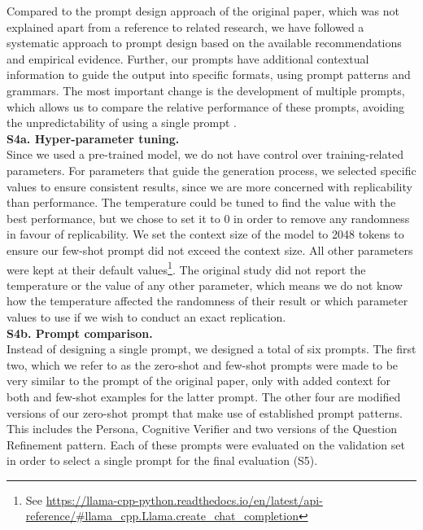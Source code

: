 \documentclass[a4paper]{article}
\begin{document}
Compared to the prompt design approach of the original paper, which was not explained apart from a reference to related research, we have followed a systematic approach to prompt design based on the available recommendations and empirical evidence. Further, our prompts have additional contextual information to guide the output into specific formats, using prompt patterns and grammars. The most important change is the development of multiple prompts, which allows us to compare the relative performance of these prompts, avoiding the unpredictability of using a single prompt \cite{mizrahi2024stateartmultipromptllm}.\\

\textbf{S4a. Hyper-parameter tuning.}\\
Since we used a pre-trained model, we do not have control over training-related parameters. For parameters that guide the generation process, we selected specific values to ensure consistent results, since we are more concerned with replicability than performance. The temperature could be tuned to find the value with the best performance, but we chose to set it to 0 in order to remove any randomness in favour of replicability. We set the context size of the model to 2048 tokens to ensure our few-shot prompt did not exceed the context size. All other parameters were kept at their default values\footnote{See \url{https://llama-cpp-python.readthedocs.io/en/latest/api-reference/#llama_cpp.Llama.create_chat_completion}}. The original study did not report the temperature or the value of any other parameter, which means we do not know how the temperature affected the randomness of their result or which parameter values to use if we wish to conduct an exact replication.\\

\textbf{S4b. Prompt comparison.}\\
Instead of designing a single prompt, we designed a total of six prompts. The first two, which we refer to as the zero-shot and few-shot prompts were made to be very similar to the prompt of the original paper, only with added context for both and few-shot examples for the latter prompt. The other four are modified versions of our zero-shot prompt that make use of established prompt patterns. This includes the Persona, Cognitive Verifier and two versions of the Question Refinement pattern. Each of these prompts were evaluated on the validation set in order to select a single prompt for the final evaluation (S5). 
\end{document}
